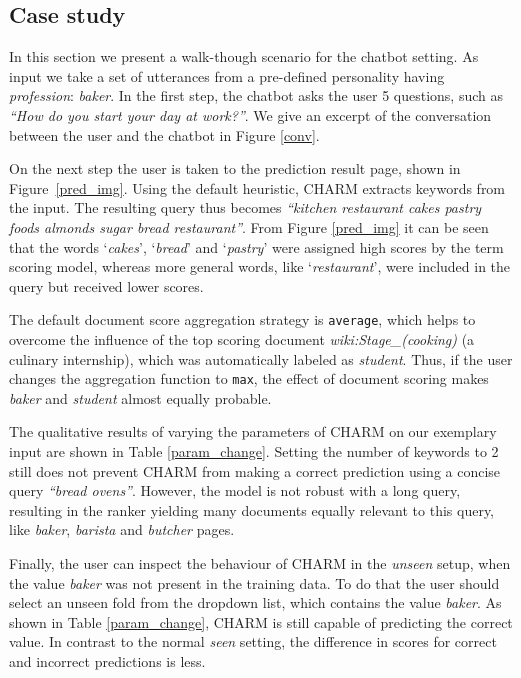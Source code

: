 \subsection{Case study}
\label{sec:case-study}

In this section we present a walk-though scenario for the chatbot setting. As input we take a set of utterances from a pre-defined personality having \textit{profession}: \textit{baker}. In the first step, the chatbot asks the user 5 questions, such as \emph{``How do you start your day at work?''}. We give an excerpt of the conversation between the user and the chatbot in Figure \ref{conv}. 

On the next step the user is taken to the prediction result page, shown in Figure~\ref{pred_img}. Using the default heuristic, CHARM extracts  keywords from the input.
The resulting query thus becomes \textit{``kitchen restaurant cakes pastry foods almonds sugar bread restaurant''}. From Figure \ref{pred_img} it can be seen that the words `\textit{cakes}', `\textit{bread}' and `\textit{pastry}' were assigned high scores by the term scoring model, whereas more general words, like `\textit{restaurant}', were included in the query but received lower scores.

The default document score aggregation strategy is \texttt{average}, which helps to overcome the influence of the top scoring document \emph{wiki:Stage\_(cooking)} (a culinary internship), which was automatically labeled as \textit{student}. 
Thus, if the user changes the aggregation function to \texttt{max}, the effect of document scoring makes \emph{baker} and \emph{student} almost equally probable. 

The qualitative results of varying the parameters of CHARM on our exemplary input are shown in Table \ref{param_change}. 
Setting the number of keywords to 2 still does not prevent CHARM from making a correct prediction using a concise query \textit{``bread ovens''}. However, the model is not robust with a long query, resulting in the ranker yielding many documents equally relevant to this query, like \emph{baker}, \emph{barista} and \emph{butcher} pages.

Finally, the user can inspect the behaviour of CHARM in the \emph{unseen} setup, when the value \emph{baker} was not present in the training data. To do that the user should select an unseen fold from the dropdown list, which contains the value \emph{baker}. As shown in Table \nolinebreak\ref{param_change}, CHARM is still capable of predicting the correct value. In contrast to the normal \textit{seen} setting, the difference in scores for correct and incorrect predictions is less.

